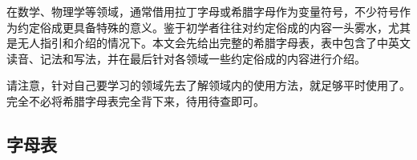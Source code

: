 
\begin{issues}
\issueDraft
\end{issues}

在数学、物理学等领域，通常借用拉丁字母或希腊字母作为变量符号，不少符号作为约定俗成更具备特殊的意义。鉴于初学者往往对约定俗成的内容一头雾水，尤其是无人指引和介绍的情况下。本文会先给出完整的希腊字母表，表中包含了中英文读音、记法和写法，并在最后针对各领域一些约定俗成的内容进行介绍。

请注意，针对自己要学习的领域先去了解领域内的使用方法，就足够平时使用了。完全不必将希腊字母表完全背下来，待用待查即可。


\subsection{字母表}

